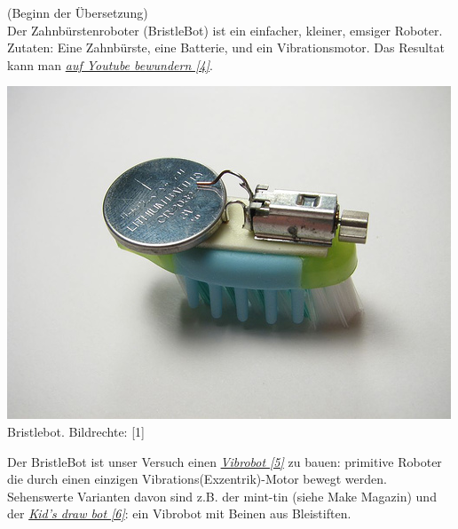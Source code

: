 (Beginn der Übersetzung) \\

Der Zahnbürstenroboter (BristleBot) ist ein einfacher, kleiner, emsiger Roboter. Zutaten: Eine Zahnbürste, eine Batterie, und ein Vibrationsmotor. Das Resultat kann man \href{http://youtu.be/rUSTXUis_ys}{\textit{auf Youtube bewundern [4]}}.

\begin{center}
\includegraphics[width=\linewidth]{bristlebot/bristlebot1.jpg}\\
\footnotesize{Bristlebot. Bildrechte: [1]}
\end{center}

Der BristleBot ist unser Versuch einen \href{http://makezine.com/projects/make-10/vibrobots/}{\textit{Vibrobot [5]}} zu bauen: primitive Roboter die durch einen einzigen Vibrations(Exzentrik)-Motor bewegt werden. Sehenswerte Varianten davon sind z.B. der mint-tin (siehe Make Magazin) und der \href{http://www.finkbuilt.com/blog/kids-art-bot/}{\textit{Kid's draw bot [6]}}: ein Vibrobot mit Beinen aus Bleistiften. \\
 
